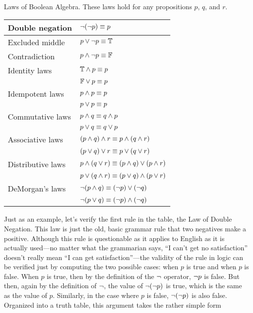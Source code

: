  {Laws of Boolean Algebra.  These laws hold for any
    propositions $p$, $q$, and $r$.}
  {\begin{tabular}{|l|l|}
      \hline
      \strut Double negation&   $\lnot(\lnot p)\equiv p$\\
      \hline
      \strut Excluded middle&   $p\vee\lnot p\equiv\mathbb{T}$\\
      \strut Contradiction&   $p\wedge\lnot p\equiv\mathbb{F}$\\
      \hline
      \strut Identity laws&          $\mathbb{T}\wedge p\equiv p$\\
      \strut&                        $\mathbb{F}\vee p \equiv p$\\
      \hline
      \strut Idempotent laws&    $p\wedge p\equiv p$\\
      \strut&                   $p\vee p\equiv p$\\
      \hline
      \strut Commutative laws&   $p\wedge q\equiv q\wedge p$\\
      \strut&                   $p\vee q\equiv q\vee p$\\
      \hline
      \strut Associative laws&   $(p\wedge q)\wedge r\equiv p\wedge(q\wedge r)$\\
      \strut&                   $(p\vee q)\vee r\equiv p\vee(q\vee r)$\\
      \hline
      \strut Distributive laws&  $p\wedge(q\vee r)\equiv (p\wedge q)\vee (p\wedge r)$\\
      \strut&                   $p\vee(q\wedge r)\equiv (p\vee q)\wedge (p\vee r)$\\
      \hline
      \strut DeMorgan's laws&    $\lnot(p\wedge q)\equiv (\lnot p)\vee(\lnot q)$\\
      \strut&                   $\lnot(p\vee q)\equiv (\lnot p)\wedge(\lnot q)$\\
      \hline
   \end{tabular}
  }

Just as an example, let's verify the first rule in the table,
the Law of Double Negation.  
This law is just the old, basic grammar rule
that two negatives make a positive.  Although this rule is questionable
as it applies to English as it is actually used---no matter what the
grammarian says, ``I can't get no satisfaction'' doesn't really
mean ``I can get satisfaction''---the validity of the rule in logic
can be verified just by computing the two possible cases: when $p$
is true and when $p$ is false.  When $p$ is true, then by the definition
of the $\lnot$ operator, $\lnot p$ is false.  But then, again by the
definition of $\lnot$, the value of $\lnot(\lnot p)$ is true, which is
the same as the value of $p$.  Similarly, in the case where 
$p$ is false, $\lnot(\lnot p)$ is also false.  Organized into a truth
table, this argument takes the rather simple form

